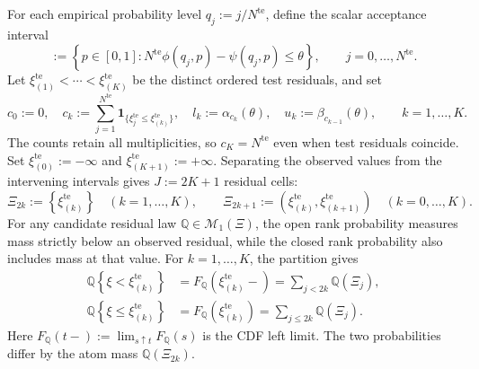 \documentclass[review,11pt,3p,authoryear,nopreprintline]{elsarticle}
\begin{document}
For each empirical probability level $q_j:=j/N^{\mathrm{te}}$, define the scalar acceptance interval
\begin{equation}
  [\alpha_j(\theta),\beta_j(\theta)]
  :=\left\{p\in[0,1]:
  N^{\mathrm{te}}\phi(q_j,p)-\psi(q_j,p)\le\theta\right\},
  \qquad j=0,\ldots,N^{\mathrm{te}}.
  \label{eq-dw-rank-acceptance}
\end{equation}
Let $\xi_{(1)}^{\mathrm{te}}<\cdots<\xi_{(K)}^{\mathrm{te}}$ be the distinct ordered test residuals, and set
\begin{equation}
  c_0:=0,\quad
  c_k:=\sum_{j=1}^{N^{\mathrm{te}}}\mathbf1_{\{\xi_j^{\mathrm{te}}\le\xi_{(k)}^{\mathrm{te}}\}},\quad
  l_k:=\alpha_{c_k}(\theta),\quad
  u_k:=\beta_{c_{k-1}}(\theta),\qquad k=1,\ldots,K.
  \label{eq-dw-counts-and-levels}
\end{equation}
The counts retain all multiplicities, so $c_K=N^{\mathrm{te}}$ even when test residuals coincide. Set $\xi_{(0)}^{\mathrm{te}}:=-\infty$ and $\xi_{(K+1)}^{\mathrm{te}}:=+\infty$. Separating the observed values from the intervening intervals gives $J:=2K+1$ residual cells:
\begin{equation}
  \Xi_{2k}:=\left\{\xi_{(k)}^{\mathrm{te}}\right\}
    \quad\left(k=1,\ldots,K\right),
  \qquad
  \Xi_{2k+1}:=\left(\xi_{(k)}^{\mathrm{te}},\xi_{(k+1)}^{\mathrm{te}}\right)
    \quad\left(k=0,\ldots,K\right).
  \label{eq-residual-cells}
\end{equation}
For any candidate residual law $\mathbb Q\in\mathcal M_1(\Xi)$, the open rank probability measures mass strictly below an observed residual, while the closed rank probability also includes mass at that value. For $k=1,\ldots,K$, the partition gives
\[
  \begin{aligned}
    \mathbb Q\left\{\xi<\xi_{(k)}^{\mathrm{te}}\right\}
      &=F_{\mathbb Q}\left(\xi_{(k)}^{\mathrm{te}}-\right)
        =\sum_{j<2k}\mathbb Q(\Xi_j),\\
    \mathbb Q\left\{\xi\le\xi_{(k)}^{\mathrm{te}}\right\}
      &=F_{\mathbb Q}\left(\xi_{(k)}^{\mathrm{te}}\right)
        =\sum_{j\le2k}\mathbb Q(\Xi_j).
  \end{aligned}
\]
Here $F_{\mathbb Q}(t-):=\lim_{s\uparrow t}F_{\mathbb Q}(s)$ is the CDF left limit. The two probabilities differ by the atom mass $\mathbb Q(\Xi_{2k})$.
\end{document}
